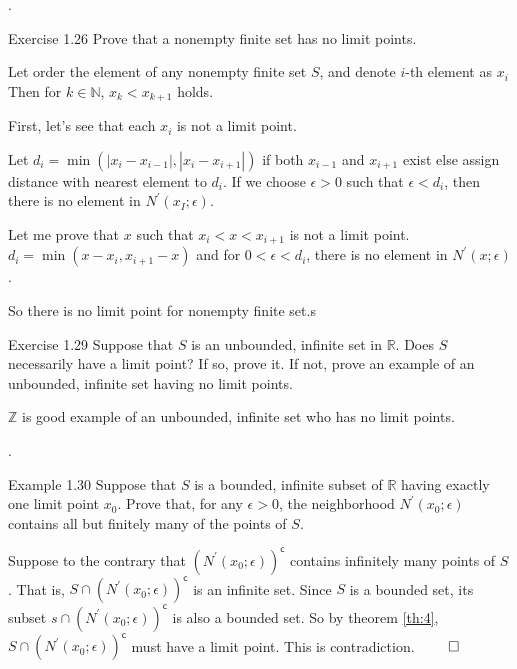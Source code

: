 \documentclass[8pt]{beamer}
\newcommand{\mbb}[1]{\mathbb{#1}}
\newcommand{\abs}[1]{\left\lvert #1 \right\rvert}
\begin{document}
\begin{frame}{.}
    \begin{block}{Exercise 1.26}
        Prove that a nonempty finite set has no limit points.

        Let order the element of any nonempty finite set $S$, and denote $i$-th element as $x_i$
        Then for $k \in \mbb{N}$, $x_k < x_{k+1}$ holds.

        First, let's see that each $x_i$ is not a limit point.

        Let $d_i = \min(\abs{x_i - x_{i-1}}, \abs{x_i - x_{i+1}})$ if both $x_{i-1}$ and $x_{i+1}$ exist else assign distance with nearest element to $d_i$.
        If we choose $\epsilon> 0$ such that $\epsilon<d_i$, then there is no element in $N^\prime(x_I; \epsilon)$.

        Let me prove that $x$ such that $x_i < x < x_{i+1}$ is not a limit point.
        $d_i = \min(x-x_{i}, x_{i+1} - x)$ and for $0 < \epsilon <d_i$, there is no element in $N^\prime(x; \epsilon)$.

        So there is no limit point for nonempty finite set.s
    \end{block}

    \begin{block}{Exercise 1.29}
        Suppose that $S$ is an unbounded, infinite set in $\mbb{R}$.
        Does $S$ necessarily have a limit point?
        If so, prove it.
        If not, prove an example of an unbounded, infinite set having no limit points.

        $\mbb{Z}$ is good example of an unbounded, infinite set who has no limit points.
    \end{block}
\end{frame}

\begin{frame}{.}
    \begin{block}{Example 1.30}
        Suppose that $S$ is a bounded, infinite subset of $\mbb{R}$ having exactly one limit point $x_0$.
        Prove that, for any $\epsilon >0$, the neighborhood $N^\prime(x_0; \epsilon)$ contains all but finitely many of the points of $S$.

        Suppose to the contrary that $(N^\prime(x_0; \epsilon))^\mathsf{c}$ contains infinitely many points of $S$.
        That is, $S \cap (N^\prime(x_0; \epsilon))^\mathsf{c}$ is an infinite set.
        Since $S$ is a bounded set, its subset $s \cap (N^\prime(x_0 ; \epsilon))^\mathsf{c}$ is also a bounded set.
        So by theorem \ref{th:4}, $S \cap (N^\prime(x_0; \epsilon))^\mathsf{c}$ must have a limit point.
        This is contradiction.
        $\qed$
    \end{block}
\end{frame}
\end{document}
